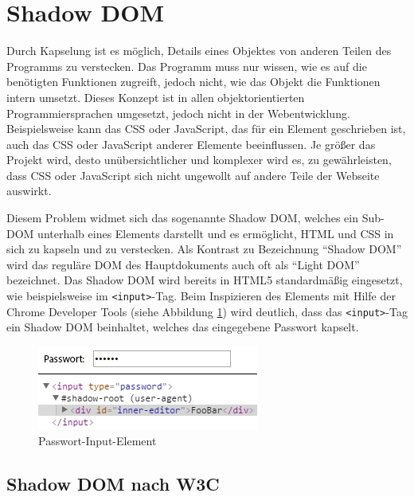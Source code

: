 \section{Shadow DOM}\label{shadow-dom}

Durch Kapselung ist es möglich, Details eines Objektes von anderen Teilen des Programms zu verstecken. Das Programm muss nur wissen, wie es auf die benötigten Funktionen zugreift, jedoch nicht, wie das Objekt die Funktionen intern umsetzt. Dieses Konzept ist in allen objektorientierten Programmiersprachen umgesetzt, jedoch nicht in der Webentwicklung. Beispielsweise kann das \ac{CSS} oder JavaScript, das für ein Element geschrieben ist, auch das \ac{CSS} oder JavaScript anderer Elemente beeinflussen. Je größer das Projekt wird, desto unübersichtlicher und komplexer wird es, zu gewährleisten, dass \ac{CSS} oder JavaScript sich nicht ungewollt auf andere Teile der Webseite auswirkt.

Diesem Problem widmet sich das sogenannte Shadow \ac{DOM}, welches ein Sub-\ac{DOM} unterhalb eines Elements darstellt und es ermöglicht, \ac{HTML} und \ac{CSS} in sich zu kapseln und zu verstecken. Als Kontrast zu Bezeichnung ``Shadow \ac{DOM}'' wird das reguläre \ac{DOM} des Hauptdokuments auch oft als ``Light \ac{DOM}'' bezeichnet. Das Shadow \ac{DOM} wird bereits in \ac{HTML}5 standardmäßig eingesetzt, wie beispielsweise im \texttt{\textless{}input\textgreater{}}-Tag. Beim Inspizieren des Elements mit Hilfe der Chrome Developer Tools (siehe Abbildung \ref{fig:itpelem}) wird deutlich, dass das \texttt{\textless{}input\textgreater{}}-Tag ein Shadow \ac{DOM} beinhaltet, welches das eingegebene Passwort kapselt. \cite[S. 109-126]{citeulike:13844975}

\begin{figure}[htbp]
 \centering
 \includegraphics{kapitel2/bilder/3-shadow-dom-input-type-password}
 \caption{Passwort-Input-Element}
 \label{fig:itpelem}
\end{figure}


\subsection{Shadow DOM nach W3C}\label{shadow-dom-nach-w3c}

